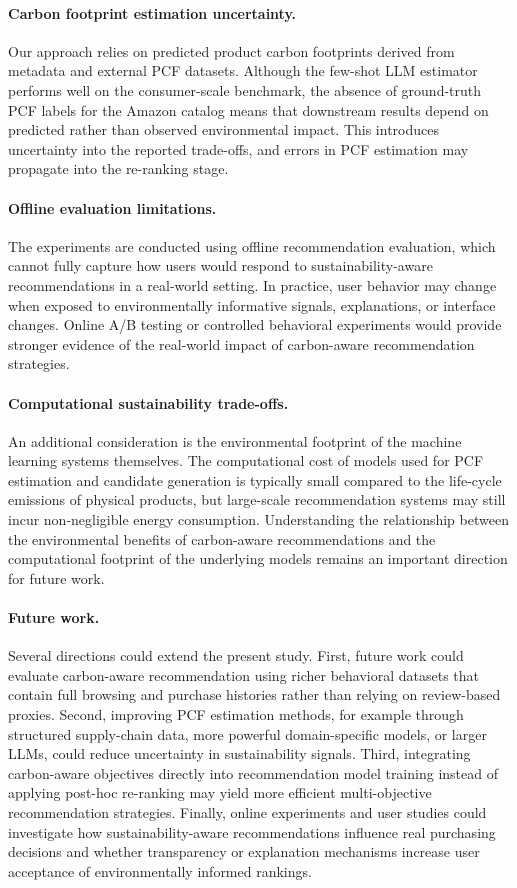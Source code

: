\documentclass[11pt]{article}
\begin{document}
\paragraph{Carbon footprint estimation uncertainty.}
Our approach relies on predicted
product carbon footprints derived from metadata and external PCF datasets.
Although the few-shot LLM estimator performs well on the consumer-scale
benchmark, the absence of ground-truth PCF labels for the Amazon catalog means
that downstream results depend on predicted rather than observed environmental
impact. This introduces uncertainty into the reported trade-offs, and errors in
PCF estimation may propagate into the re-ranking stage.

\paragraph{Offline evaluation limitations.}
The experiments are conducted using offline recommendation evaluation, which cannot fully
capture how users would respond to sustainability-aware recommendations in a real-world
setting. In practice, user behavior may change when exposed to environmentally informative
signals, explanations, or interface changes. Online A/B testing or controlled behavioral
experiments would provide stronger evidence of the real-world impact of carbon-aware
recommendation strategies.

\paragraph{Computational sustainability trade-offs.}
An additional consideration is the environmental footprint of the machine learning systems
themselves. The computational cost of models used for PCF estimation and candidate
generation is typically small compared to the life-cycle emissions of physical products,
but large-scale recommendation systems may still incur non-negligible energy consumption.
Understanding the relationship between the environmental benefits of carbon-aware
recommendations and the computational footprint of the underlying models remains an
important direction for future work.

\paragraph{Future work.}
Several directions could extend the present study. First, future work could evaluate
carbon-aware recommendation using richer behavioral datasets that contain full browsing and
purchase histories rather than relying on review-based proxies. Second, improving PCF
estimation methods, for example through structured supply-chain data, more powerful
domain-specific models, or larger LLMs, could reduce uncertainty in sustainability signals. Third, integrating
carbon-aware objectives directly into recommendation model training instead of applying
post-hoc re-ranking may yield more efficient multi-objective recommendation strategies.
Finally, online experiments and user studies could investigate how sustainability-aware
recommendations influence real purchasing decisions and whether transparency or explanation
mechanisms increase user acceptance of environmentally informed rankings.
\end{document}
